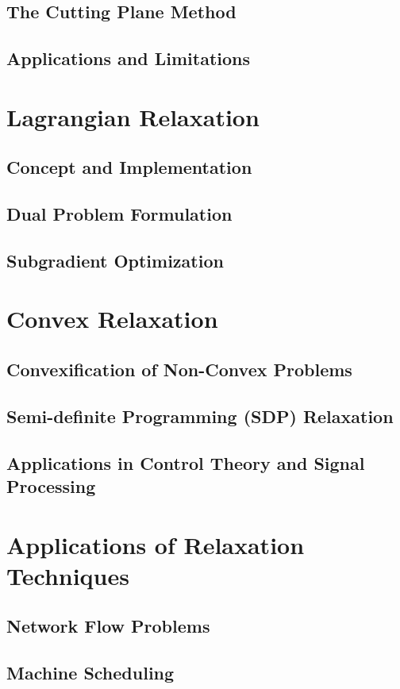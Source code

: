 \documentclass[12pt]{book} %
\begin{document}
\subsection{The Cutting Plane Method}
\subsection{Applications and Limitations}

\section{Lagrangian Relaxation}
\subsection{Concept and Implementation}
\subsection{Dual Problem Formulation}
\subsection{Subgradient Optimization}

\section{Convex Relaxation}
\subsection{Convexification of Non-Convex Problems}
\subsection{Semi-definite Programming (SDP) Relaxation}
\subsection{Applications in Control Theory and Signal Processing}

\section{Applications of Relaxation Techniques}
\subsection{Network Flow Problems}
\subsection{Machine Scheduling}
\end{document}
